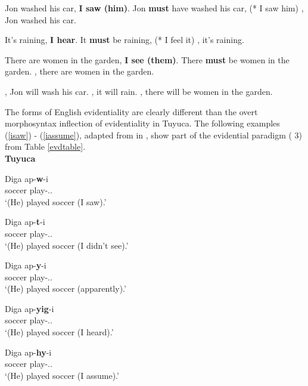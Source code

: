 \documentclass{article}
\begin{document}
\begin{exe}
\ex \label{fullsubject} 
\begin{xlist}
\ex Jon washed his car, {\bf I saw (him)}.\label{paren}
\ex Jon {\bf must} have washed his car, (* I saw him)\label{epimod}
, Jon washed his car.\label{adv}
\end{xlist}
\ex \label{itsubject}
\begin{xlist}
\ex It's raining, {\bf I hear}.\label{paren1} 
\ex It {\bf must} be raining, (* I feel it)\label{epimod1}
, it's raining.\label{adv1}
\end{xlist}
\ex \label{theresubject}
\begin{xlist}
\ex There are women in the garden, {\bf I see (them)}.\label{paren2}
\ex There {\bf must} be women in the garden.\label{epimod2}
, there are women in the garden.\label{adv2}
\end{xlist}
\ex \label{future}
\begin{xlist}
, Jon will wash his car.
, it will rain.
, there will be women in the garden.
\end{xlist}
 \end{exe}
 

The forms of English evidentiality are clearly different than the overt morphosyntax inflection of evidentiality in Tuyuca. The following examples (\ref{isaw}) - (\ref{iassume}), adapted from \cite{barnes84evd,barnes90classifiers,barnes94negation,barnes96autosegments} in \cite{bowles09tuyucadata}, show part of the evidential paradigm (\pst{} 3\m\sg{}) from Table \ref{evdtable}.  
\\

{\bf Tuyuca} \begin{exe} 
\ex \label{isaw}
\gll Diga ap-{\bf w}-i\\
 soccer play-\evd.\Vis.\m\sg \\
\glt `(He) played soccer (I saw).'

\ex
\gll Diga ap-{\bf t}-i \\ 
soccer play-\evd.\Nvis.\m\sg \\
\glt `(He) played soccer (I didn't see).'

\ex
\gll Diga ap-{\bf y}-i \\
soccer play-\evd.\Apr.\m\sg \\
\glt `(He) played soccer (apparently).'                  
 
\ex
\gll Diga ap-{\bf yig}-i \\
soccer play-\evd.\Scnd.\m\sg \\
\glt `(He) played soccer (I heard).'
                     
\ex \label{iassume}
\gll Diga ap-{\bf hy}-i \\
soccer play-\evd.\Asm.\m\sg \\
\glt `(He) played soccer (I assume).'\\ 
\end{exe}
\end{document}
